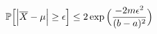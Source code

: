     \begin{equation}\label{eq:Hoeffding}
        \mathbb{P} \Big[ \Big| \overline{X} - \mu \Big| \geq \epsilon \Big] \leq 2 \exp{ \Big( {\frac{-2m\epsilon^2}{(b-a)^2}} \Big) }
    \end{equation}

\endinput
